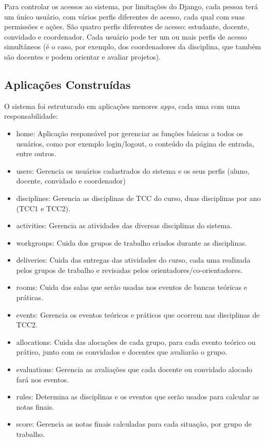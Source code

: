 Para controlar os acessos ao sistema, por limitações do Django, cada pessoa terá um único usuário, com vários perfis diferentes de acesso, cada qual com suas permissões e ações. São quatro perfis diferentes de acesso: estudante, docente, convidado e coordenador. Cada usuário pode ter um ou mais perfis de acesso simultâneos (é o caso, por exemplo, dos coordenadores da disciplina, que também são docentes e podem orientar e avaliar projetos).

\subsection{Aplicações Construídas}
O sistema foi estruturado em aplicações menores \textit{apps}, cada uma com uma responsabilidade:

\begin{itemize}
    \item home: Aplicação responsável por gerenciar as funções básicas a todos os usuários, como por exemplo login/logout, o conteúdo da página de entrada, entre outros.
    \item users: Gerencia os usuários cadastrados do sistema e os seus perfis (aluno, docente, convidado e coordenador)
    \item disciplines: Gerencia as disciplinas de TCC do curso, duas disciplinas por ano (TCC1 e TCC2).
    \item activities: Gerencia as atividades das diversas disciplinas do sistema.
    \item workgroups: Cuida dos grupos de trabalho criados durante as disciplinas. 
    \item deliveries: Cuida das entregas das atividades do curso, cada uma realizada pelos grupos de trabalho e revisadas pelos orientadores/co-orientadores.
    \item rooms: Cuida das salas que serão usadas nos eventos de bancas teóricas e práticas.
    \item events: Gerencia os eventos teóricos e práticos que ocorrem nas disciplinas de TCC2.
    \item allocations: Cuida das alocações de cada grupo, para cada evento teórico ou prático, junto com os convidados e docentes que avaliarão o grupo.
    \item evaluations: Gerencia as avaliações que cada docente ou convidado alocado fará nos eventos.
    \item rules: Determina as disciplinas e os eventos que serão usados para calcular as notas finais.
    \item score: Gerencia as notas finais calculadas para cada situação, por grupo de trabalho.
\end{itemize}